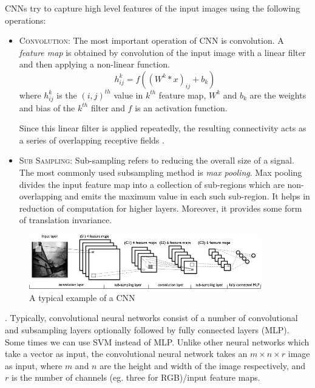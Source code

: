 \noindent CNNs try to capture high level features of the input images using the following operations:
\begin{itemize}
\item \textsc{Convolution}: The most important operation of CNN is convolution.  A \textit{feature map} is obtained by convolution of the input image with a linear filter and then applying a non-linear function. 
$$h^k_{ij} = \mathit{f}( (W^k * x)_{ij} + b_k )$$
where $h^k_{ij}$ is the $(i,j)^{th}$ value in $k^{th}$ feature map, $W^k$ and $b_k$ are the weights and bias of the $k^{th}$ filter and $\mathit{f}$ is an activation function.

Since this linear filter is applied repeatedly, the resulting connectivity acts as a series of overlapping receptive fields \cite{KarpathyCVPR14}.
\item \textsc{Sub Sampling}: Sub-sampling refers to reducing the overall size of a signal.  The most commonly used subsampling method is \textit{max pooling}.  Max pooling divides the input feature map into a collection of sub-regions which are non-overlapping and emits the maximum value in each such sub-region.  It helps in reduction of computation for higher layers.  Moreover, it provides some form of translation invariance. 
\end{itemize}

\begin{figure}[!ht]
\centering
\includegraphics[width=0.9\textwidth]{./imgs/cnn1.png} 
\caption[An example of a convolutional neural network]{A typical example of a CNN \footnotemark}
\label{fig:cnn}
\end{figure}
. 
Typically, convolutional neural networks consist of a number of convolutional and subsampling layers optionally followed by fully connected layers (MLP).  Some times we can use SVM instead of MLP.  Unlike other neural networks which take a vector as input,  the convolutional neural network takes an $m \times n \times r$ image as input, where $m$ and $n$ are the height and width of the image respectively, and $r$ is the number of channels (eg. three for RGB)/input feature maps. 

